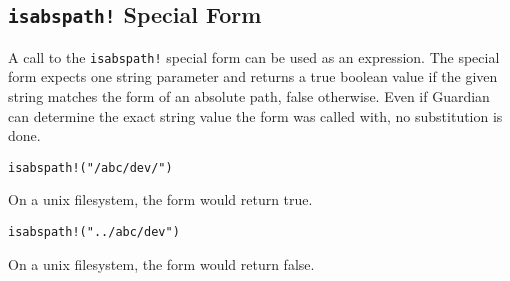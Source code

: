 
\subsection{\texttt{isabspath!} Special Form}
{
	A call to the \texttt{isabspath!} special form can be used as an expression.
	The special form expects one string parameter and returns a true boolean
	value if the given string matches the form of an absolute path, false
	otherwise.
	Even if Guardian can determine the exact string value the form was
	called with, no substitution is done.
	
	\begin{itemize}
	{
		\item \texttt{isabspath!("/abc/dev/")}
		
			On a unix filesystem, the form would return true.
		
		\item \texttt{isabspath!("../abc/dev")}
		
			On a unix filesystem, the form would return false.
	}
	\end{itemize}
}
